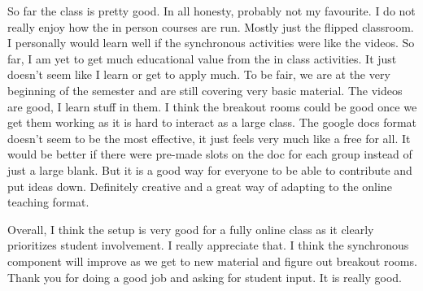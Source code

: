 \documentclass[11pt]{article}
\begin{document}
So far the class is pretty good. In all honesty,  probably not my favourite. I do not really enjoy how the in person courses are run. Mostly just the flipped classroom. I personally would learn well if the synchronous activities were like the videos. So far, I am yet to get much educational value from the in class activities. It just doesn't seem like I learn or get to apply much. To be fair, we are at the very beginning of the semester and are still covering very basic material. The videos are good, I learn stuff in them. I think the breakout rooms could be good once we get them working as it is hard to interact as a large class. The google docs format doesn't seem to be the most effective, it just feels very much like a free for all. It would be better if there were pre-made slots on the doc for each group instead of just a large blank. But it is a good way for everyone to be able to contribute and put ideas down. Definitely creative and a great way of adapting to the online teaching format. 

Overall, I think the setup is very good for a fully online class as it clearly prioritizes student involvement. I really appreciate that. I think the synchronous component will improve as we get to new material and figure out breakout rooms. Thank you for doing a good job and asking for student input. It is really good. 
\end{document}
